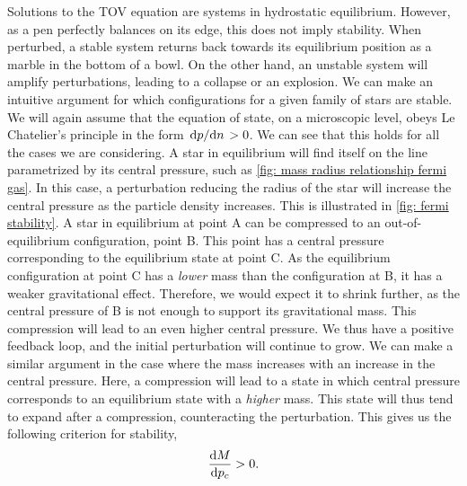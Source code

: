 Solutions to the TOV equation are systems in hydrostatic equilibrium.
However, as a pen perfectly balances on its edge, this does not imply stability.
When perturbed, a stable system returns back towards its equilibrium position as a marble in the bottom of a bowl.
On the other hand, an unstable system will amplify perturbations, leading to a collapse or an explosion.
We can make an intuitive argument for which configurations for a given family of stars are stable.
We will again assume that the equation of state, on a microscopic level, obeys Le Chatelier's principle in the form $\odv{p}/{n} > 0$.
We can see that this holds for all the cases we are considering.
A star in equilibrium will find itself on the line parametrized by its central pressure, such as \autoref{fig: mass radius relationship fermi gas}.
In this case, a perturbation reducing the radius of the star will increase the central pressure as the particle density increases. 
This is illustrated in \autoref{fig: fermi stability}.
A star in equilibrium at point A can be compressed to an out-of-equilibrium configuration, point B.
This point has a central pressure corresponding to the equilibrium state at point C.
As the equilibrium configuration at point C has a \emph{lower} mass than the configuration at B, it has a weaker gravitational effect.
Therefore, we would expect it to shrink further, as the central pressure of B is not enough to support its gravitational mass.
This compression will lead to an even higher central pressure.
We thus have a positive feedback loop, and the initial perturbation will continue to grow.
We can make a similar argument in the case where the mass increases with an increase in the central pressure.
Here, a compression will lead to a state in which central pressure corresponds to an equilibrium state with a \emph{higher} mass.
This state will thus tend to expand after a compression, counteracting the perturbation.
This gives us the following criterion for stability,
%
\begin{equation}
    \odv{M}{p_c} > 0.
\end{equation}

